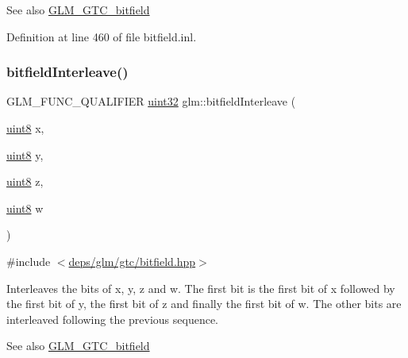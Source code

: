 \begin{DoxySeeAlso}{See also}
\hyperlink{group__gtc__bitfield}{G\+L\+M\+\_\+\+G\+T\+C\+\_\+bitfield} 
\end{DoxySeeAlso}


Definition at line 460 of file bitfield.\+inl.

\mbox{\label{group__gtc__bitfield_ga447c0bbed9d60c14578626d8f03f3755}} 
\subsubsection{\texorpdfstring{bitfield\+Interleave()}{bitfieldInterleave()}\hspace{0.1cm}{\footnotesize\ttfamily [14/16]}}
{\footnotesize\ttfamily G\+L\+M\+\_\+\+F\+U\+N\+C\+\_\+\+Q\+U\+A\+L\+I\+F\+I\+ER \hyperlink{group__gtc__type__precision_ga202b6a53c105fcb7e531f9b443518451}{uint32} glm\+::bitfield\+Interleave (\begin{DoxyParamCaption}\item[{\hyperlink{group__gtc__type__precision_ga1a7dcd8aac97cc8020817c94049deff2}{uint8}}]{x,  }\item[{\hyperlink{group__gtc__type__precision_ga1a7dcd8aac97cc8020817c94049deff2}{uint8}}]{y,  }\item[{\hyperlink{group__gtc__type__precision_ga1a7dcd8aac97cc8020817c94049deff2}{uint8}}]{z,  }\item[{\hyperlink{group__gtc__type__precision_ga1a7dcd8aac97cc8020817c94049deff2}{uint8}}]{w }\end{DoxyParamCaption})}



{\ttfamily \#include $<$\hyperlink{bitfield_8hpp}{deps/glm/gtc/bitfield.\+hpp}$>$}

Interleaves the bits of x, y, z and w. The first bit is the first bit of x followed by the first bit of y, the first bit of z and finally the first bit of w. The other bits are interleaved following the previous sequence.

\begin{DoxySeeAlso}{See also}
\hyperlink{group__gtc__bitfield}{G\+L\+M\+\_\+\+G\+T\+C\+\_\+bitfield} 
\end{DoxySeeAlso}


